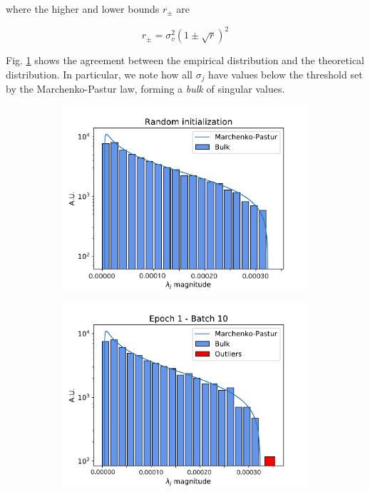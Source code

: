 \documentclass[notitlepage]{revtex4-1}
\begin{document}
where the higher and lower bounds \(r_{\pm}\) are

\begin{equation}
r_{\pm} = \sigma_v^2 \left(1 \pm \sqrt{r} \right)^2
\end{equation}

Fig. \ref{fig:mp_fit} shows the agreement between the empirical distribution and the theoretical distribution. In particular, we note how all \(\sigma_j\) have values below the threshold set by the Marchenko-Pastur law, forming a \textit{bulk} of singular values.

\begin{figure}
  \centering
  \begin{subfigure}{.32\linewidth}
    \includegraphics[width=\linewidth]{mp_fit.eps}
    \caption{}
    \label{fig:mp_fit}
  \end{subfigure}
  \begin{subfigure}{.32\linewidth}
    \includegraphics[width=\linewidth]{sv_distr_e1_b10.eps}

\end{subfigure}
\end{figure}
\end{document}

